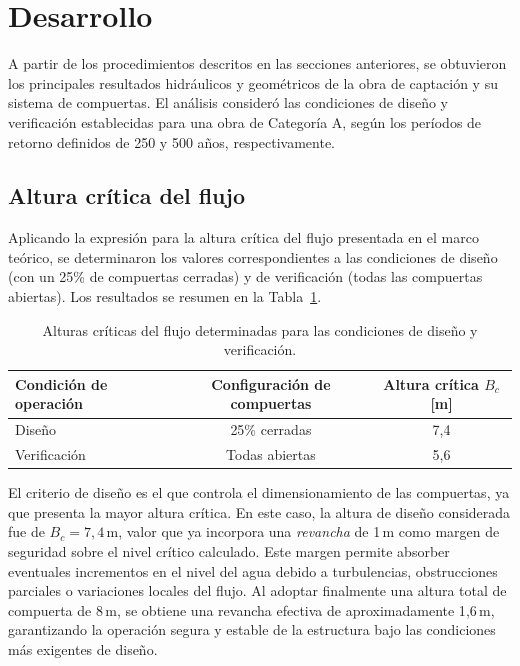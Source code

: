 \documentclass{article} %
\begin{document}
\newpage
\section{Desarrollo}

A partir de los procedimientos descritos en las secciones anteriores, se obtuvieron los principales resultados hidráulicos y geométricos de la obra de captación y su sistema de compuertas. El análisis consideró las condiciones de diseño y verificación establecidas para una obra de Categoría A, según los períodos de retorno definidos de 250 y 500 años, respectivamente.

\subsection{Altura crítica del flujo}

Aplicando la expresión para la altura crítica del flujo presentada en el marco teórico, se determinaron los valores correspondientes a las condiciones de diseño (con un 25\% de compuertas cerradas) y de verificación (todas las compuertas abiertas). Los resultados se resumen en la Tabla~\ref{tab:bcresultados}.

\begin{table}[htbp]
\centering
\begin{tabular}{lcc}
\hline
Condición de operación & Configuración de compuertas & Altura crítica \( B_c \) [m] \\
\hline
Diseño & 25\% cerradas & 7,4 \\
Verificación & Todas abiertas & 5,6 \\
\hline
\end{tabular}
\caption{Alturas críticas del flujo determinadas para las condiciones de diseño y verificación.}
\label{tab:bcresultados}
\end{table}

El criterio de diseño es el que controla el dimensionamiento de las compuertas, ya que presenta la mayor altura crítica. En este caso, la altura de diseño considerada fue de \( B_c = 7{,}4\,\text{m} \), valor que ya incorpora una \textit{revancha} de 1\,m como margen de seguridad sobre el nivel crítico calculado. Este margen permite absorber eventuales incrementos en el nivel del agua debido a turbulencias, obstrucciones parciales o variaciones locales del flujo. Al adoptar finalmente una altura total de compuerta de 8\,m, se obtiene una revancha efectiva de aproximadamente 1{,}6\,m, garantizando la operación segura y estable de la estructura bajo las condiciones más exigentes de diseño.
\end{document}
